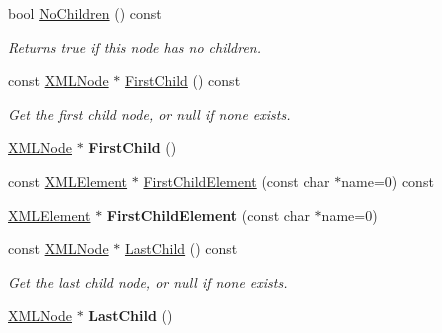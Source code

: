 \begin{DoxyCompactItemize}
\item 
\hypertarget{classtinyxml2_1_1_x_m_l_node_a96afe34a9ccd0ed4c0cff32beb42cc6c}{}bool \hyperlink{classtinyxml2_1_1_x_m_l_node_a96afe34a9ccd0ed4c0cff32beb42cc6c}{No\+Children} () const \label{classtinyxml2_1_1_x_m_l_node_a96afe34a9ccd0ed4c0cff32beb42cc6c}

\begin{DoxyCompactList}\small\item\em Returns true if this node has no children. \end{DoxyCompactList}\item 
\hypertarget{classtinyxml2_1_1_x_m_l_node_a60e923d13d7dc01f45ab90a2f948b02a}{}const \hyperlink{classtinyxml2_1_1_x_m_l_node}{X\+M\+L\+Node} $\ast$ \hyperlink{classtinyxml2_1_1_x_m_l_node_a60e923d13d7dc01f45ab90a2f948b02a}{First\+Child} () const \label{classtinyxml2_1_1_x_m_l_node_a60e923d13d7dc01f45ab90a2f948b02a}

\begin{DoxyCompactList}\small\item\em Get the first child node, or null if none exists. \end{DoxyCompactList}\item 
\hypertarget{classtinyxml2_1_1_x_m_l_node_a2d6c70c475146b48bc93a7fafdeff5e0}{}\hyperlink{classtinyxml2_1_1_x_m_l_node}{X\+M\+L\+Node} $\ast$ {\bfseries First\+Child} ()\label{classtinyxml2_1_1_x_m_l_node_a2d6c70c475146b48bc93a7fafdeff5e0}

\item 
const \hyperlink{classtinyxml2_1_1_x_m_l_element}{X\+M\+L\+Element} $\ast$ \hyperlink{classtinyxml2_1_1_x_m_l_node_a4a38e0da23f4d97673a86c77d5cae5c2}{First\+Child\+Element} (const char $\ast$name=0) const 
\item 
\hypertarget{classtinyxml2_1_1_x_m_l_node_af1e0e475cc27d5e7eeaf4d732691b741}{}\hyperlink{classtinyxml2_1_1_x_m_l_element}{X\+M\+L\+Element} $\ast$ {\bfseries First\+Child\+Element} (const char $\ast$name=0)\label{classtinyxml2_1_1_x_m_l_node_af1e0e475cc27d5e7eeaf4d732691b741}

\item 
\hypertarget{classtinyxml2_1_1_x_m_l_node_a6088246532b02895beb0e6fa561a7f3b}{}const \hyperlink{classtinyxml2_1_1_x_m_l_node}{X\+M\+L\+Node} $\ast$ \hyperlink{classtinyxml2_1_1_x_m_l_node_a6088246532b02895beb0e6fa561a7f3b}{Last\+Child} () const \label{classtinyxml2_1_1_x_m_l_node_a6088246532b02895beb0e6fa561a7f3b}

\begin{DoxyCompactList}\small\item\em Get the last child node, or null if none exists. \end{DoxyCompactList}\item 
\hypertarget{classtinyxml2_1_1_x_m_l_node_ad7552c8cb1dc0cb6f3bdc14a9d115dbf}{}\hyperlink{classtinyxml2_1_1_x_m_l_node}{X\+M\+L\+Node} $\ast$ {\bfseries Last\+Child} ()\label{classtinyxml2_1_1_x_m_l_node_ad7552c8cb1dc0cb6f3bdc14a9d115dbf}


\end{DoxyCompactItemize}

